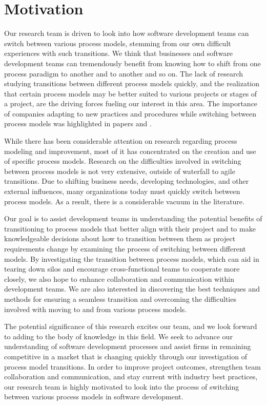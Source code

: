 \documentclass[conference]{IEEEtran}
\begin{document}
\section{Motivation}
Our research team is driven to look into how software development teams can switch between various process models, stemming from our own difficult experiences with such transitions. We think that businesses and software development teams can tremendously benefit from knowing how to shift from one process paradigm to another and to another and so on. The lack of research studying transitions between different process models quickly, and the realization that certain process models may be better suited to various projects or stages of a project, are the driving forces fueling our interest in this area. The importance of companies adapting to new practices and procedures while switching between process models was highlighted in papers \cite{chen2010} and \cite{AFZAL2009957}.

While there has been considerable attention on research regarding process modeling and improvement, most of it has concentrated on the creation and use of specific process models. Research on the difficulties involved in switching between process models is not very extensive, outside of waterfall to agile transitions. Due to shifting business needs, developing technologies, and other external influences, many organizations today must quickly switch between process models. As a result, there is a considerable vacuum in the literature.

Our goal is to assist development teams in understanding the potential benefits of transitioning to process models that better align with their project and to make knowledgeable decisions about how to transition between them as project requirements change by examining the process of switching between different models. By investigating the transition between process models, which can aid in tearing down silos and encourage cross-functional teams to cooperate more closely, we also hope to enhance collaboration and communication within development teams. We are also interested in discovering the best techniques and methods for ensuring a seamless transition and overcoming the difficulties involved with moving to and from various process models.

The potential significance of this research excites our team, and we look forward to adding to the body of knowledge in this field. We seek to advance our understanding of software development processes and assist firms in remaining competitive in a market that is changing quickly through our investigation of process model transitions. In order to improve project outcomes, strengthen team collaboration and communication, and stay current with industry best practices, our research team is highly motivated to look into the process of switching between various process models in software development.
\end{document}
